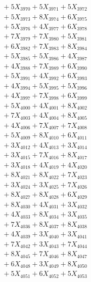 \documentclass[a4paper,10pt]{article}
\begin{document}
{\begin{align}
&\;  + 5 X_{3970} + 5 X_{3971} + 5 X_{3972} \\[0.3ex]
&\;  + 5 X_{3973} + 8 X_{3974} + 6 X_{3975} \\[0.3ex]
&\;  + 5 X_{3976} + 4 X_{3977} + 6 X_{3978} \\[0.3ex]
&\;  + 7 X_{3979} + 7 X_{3980} + 5 X_{3981} \\[0.3ex]
&\;  + 6 X_{3982} + 7 X_{3983} + 8 X_{3984} \\[0.3ex]
&\;  + 5 X_{3985} + 5 X_{3986} + 4 X_{3987} \\[0.3ex]
&\;  + 4 X_{3988} + 7 X_{3989} + 6 X_{3990} \\[0.3ex]
&\;  + 5 X_{3991} + 4 X_{3992} + 6 X_{3993} \\[0.3ex]
&\;  + 4 X_{3994} + 5 X_{3995} + 5 X_{3996} \\[0.3ex]
&\;  + 4 X_{3997} + 7 X_{3998} + 6 X_{3999} \\[0.5ex]\allowbreak
&\;  + 5 X_{4000} + 4 X_{4001} + 8 X_{4002} \\[0.3ex]
&\;  + 7 X_{4003} + 4 X_{4004} + 8 X_{4005} \\[0.3ex]
&\;  + 4 X_{4006} + 7 X_{4007} + 7 X_{4008} \\[0.3ex]
&\;  + 5 X_{4009} + 8 X_{4010} + 6 X_{4011} \\[0.3ex]
&\;  + 3 X_{4012} + 4 X_{4013} + 3 X_{4014} \\[0.3ex]
&\;  + 3 X_{4015} + 7 X_{4016} + 8 X_{4017} \\[0.3ex]
&\;  + 3 X_{4018} + 4 X_{4019} + 4 X_{4020} \\[0.3ex]
&\;  + 8 X_{4021} + 8 X_{4022} + 7 X_{4023} \\[0.3ex]
&\;  + 3 X_{4024} + 3 X_{4025} + 7 X_{4026} \\[0.3ex]
&\;  + 8 X_{4027} + 8 X_{4028} + 6 X_{4029} \\[0.5ex]\allowbreak
&\;  + 8 X_{4030} + 4 X_{4031} + 3 X_{4032} \\[0.3ex]
&\;  + 4 X_{4033} + 8 X_{4034} + 3 X_{4035} \\[0.3ex]
&\;  + 7 X_{4036} + 8 X_{4037} + 8 X_{4038} \\[0.3ex]
&\;  + 4 X_{4039} + 3 X_{4040} + 3 X_{4041} \\[0.3ex]
&\;  + 7 X_{4042} + 3 X_{4043} + 7 X_{4044} \\[0.3ex]
&\;  + 8 X_{4045} + 7 X_{4046} + 8 X_{4047} \\[0.3ex]
&\;  + 6 X_{4048} + 3 X_{4049} + 8 X_{4050} \\[0.3ex]
&\;  + 5 X_{4051} + 6 X_{4052} + 5 X_{4053} \\[0.3ex]

\end{align}}
\end{document}
